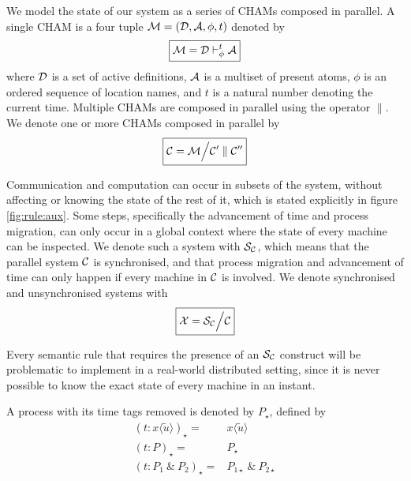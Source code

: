 We model the state of our system as a series of CHAMs composed in parallel. A
single CHAM is a four tuple $\mathcal{M} = (\mathcal{D}, \mathcal{A}, \phi, t)$ denoted by
\begin{equation*}
 \boxed{\mathcal{M} = \mathcal{D} \vdash^{t}_{\phi} \mathcal{A}}
\end{equation*}
where $\mathcal{D}$ is a set of active definitions, $\mathcal{A}$ is a multiset
of present atoms, $\phi$ is an ordered sequence of location names, and $t$ is
a natural number denoting the current time. Multiple CHAMs are composed in
parallel using the operator $\parallel$. We denote one or more CHAMs composed
in parallel by
\begin{equation*}
 \boxed{\mathcal{C} = \mathcal{M} \Big\slash \mathcal{C}'\parallel\mathcal{C}''}
\end{equation*}

Communication and computation can occur in subsets of the system, without
affecting or knowing the state of the rest of it, which is stated explicitly in
figure \ref{fig:rule:aux}. Some steps, specifically the advancement of time and
process migration, can only occur in a global context where the state of every
machine can be inspected. We denote such a system with $\mathcal{S}_{\mathcal{C}}$, which means
that the parallel system $\mathcal{C}$ is synchronised, and that process migration and
advancement of time can only happen if every machine in $\mathcal{C}$ is involved. We
denote synchronised and unsynchronised systems with
\begin{equation*}
 \boxed{\mathcal{X} = \mathcal{S}_{\mathcal{C}} \Big\slash \mathcal{C}}
\end{equation*}

Every semantic rule that requires the presence of an $\mathcal{S}_{\mathcal{C}}$ construct will be
problematic to implement in a real-world distributed setting, since it is never
possible to know the exact state of every machine in an instant.

A process with its time tags removed is denoted by $P_{\star}$, defined by
\begin{align*}
  (t : x\langle \tilde u \rangle)_\star ={}& x\langle \tilde u \rangle \\
  (t : P)_\star ={}& P_\star \\
  (t : P_1~\&~P_2)_\star ={}& P_{1\star} ~\&~ P_{2\star}
\end{align*}

